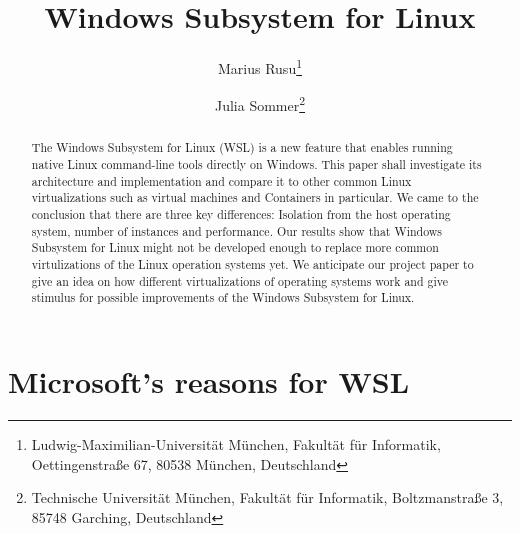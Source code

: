 \documentclass[utf8,biblatex, ngerman, english]{lni}
\begin{document}
\title[WSL]{Windows Subsystem for Linux}
\author[Marius Rusu \and Julia Sommer]
{Marius Rusu\footnote{Ludwig-Maximilian-Universität München, Fakultät für Informatik, Oettingenstraße 67, 80538 München, Deutschland } \and
 Julia Sommer\footnote{Technische Universität München, Fakultät für Informatik, Boltzmanstraße 3, 85748 Garching, Deutschland }}
\maketitle
\newpage
\tableofcontents
\newpage

\begin{abstract}
The Windows Subsystem for Linux (WSL) is a new feature that enables running native Linux command-line tools directly on Windows. This paper shall investigate its architecture and implementation and compare it to other common Linux virtualizations such as virtual machines and Containers in particular. We came to the conclusion that there are three key differences: Isolation from the host operating system, number of instances and performance. Our results show that Windows Subsystem for Linux might not be developed enough to replace more common virtulizations of the Linux operation systems yet. We anticipate our project paper to give an idea on how different virtualizations of operating systems work and give stimulus for possible improvements of the Windows Subsystem for Linux. 
\end{abstract}


\section{Microsoft's reasons for WSL}
\end{document}
